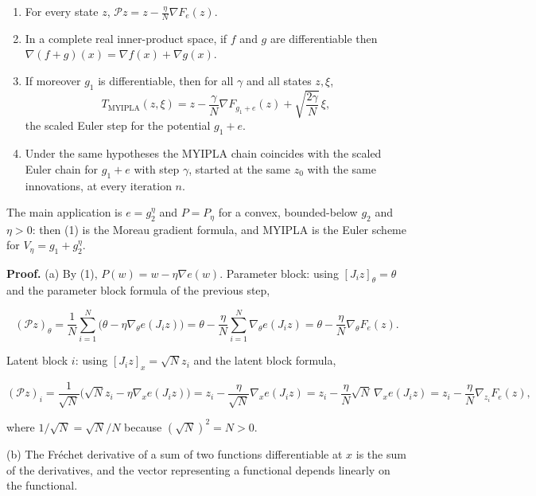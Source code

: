 \documentclass[11pt,a4paper]{report}
\begin{document}
\begin{enumerate}


\item For every state \(z\), \(\mathcal Pz=z-\frac\eta N\nabla F_e(z)\).

\item In a complete real inner-product space, if \(f\) and \(g\) are differentiable then \(\nabla(f+g)(x)=\nabla f(x)+\nabla g(x)\).

\item If moreover \(g_1\) is differentiable, then for all \(\gamma\) and all states \(z,\xi\),
\[T_{\mathrm{MYIPLA}}(z,\xi)=z-\frac\gamma N\nabla F_{g_1+e}(z)+\sqrt{\frac{2\gamma}N}\,\xi,\]
the scaled Euler step for the potential \(g_1+e\).

\item Under the same hypotheses the MYIPLA chain coincides with the scaled Euler chain for \(g_1+e\) with step \(\gamma\), started at the same \(z_0\) with the same innovations, at every iteration \(n\).

\end{enumerate}



The main application is \(e=g_2^\eta\) and \(P=P_\eta\) for a convex, bounded-below \(g_2\) and \(\eta>0\): then (1) is the Moreau gradient formula, and MYIPLA is the Euler scheme for \(V_\eta=g_1+g_2^\eta\).




\textbf{Proof.} (a) By (1), \(P(w)=w-\eta\nabla e(w)\). Parameter block: using \([J_iz]_\theta=\theta\) and the parameter block formula of the previous step,


\[(\mathcal Pz)_\theta=\frac1N\sum_{i=1}^N\bigl(\theta-\eta\nabla_\theta e(J_iz)\bigr)=\theta-\frac\eta N\sum_{i=1}^N\nabla_\theta e(J_iz)=\theta-\frac\eta N\nabla_\theta F_e(z).\]


Latent block \(i\): using \([J_iz]_x=\sqrt Nz_i\) and the latent block formula,


\[(\mathcal Pz)_i=\frac1{\sqrt N}\bigl(\sqrt Nz_i-\eta\nabla_xe(J_iz)\bigr)=z_i-\frac{\eta}{\sqrt N}\nabla_xe(J_iz)=z_i-\frac\eta N\sqrt N\,\nabla_xe(J_iz)=z_i-\frac\eta N\nabla_{z_i}F_e(z),\]


where \(1/\sqrt N=\sqrt N/N\) because \((\sqrt N)^2=N>0\).




(b) The Fréchet derivative of a sum of two functions differentiable at \(x\) is the sum of the derivatives, and the vector representing a functional depends linearly on the functional.
\end{document}
